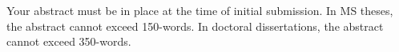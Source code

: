 \usepackage{setspace}
\begin{spacing}{2}
Your abstract must be in place at the time of initial submission. In MS theses, the abstract cannot exceed 150-words. In doctoral dissertations, the abstract cannot exceed 350-words. 
\end{spacing}
